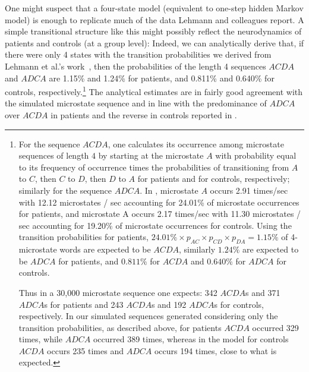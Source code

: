 \documentclass[journal]{IEEEtran}
\begin{document}
 


One might suspect that a four-state model (equivalent to one-step hidden Markov model) is enough to replicate much of the data Lehmann and colleagues report.
A simple transitional structure like this might possibly reflect the neurodynamics of patients and controls (at a group level):
 Indeed, we can analytically 
derive that, if there were only 4 states with the transition probabilities we derived from Lehmann et al.'s work~\cite{Lehmann2005}, then the 
probabilities of the length 4 sequences $ACDA$ and $ADCA$ 
are  1.15\%  and 1.24\%   for patients, and 0.811\%  and 0.640\%  for controls, respectively.\footnote{For the sequence $ACDA$,  one
 calculates its occurrence among microstate sequences of length $4$ by starting at the microstate $A$ with probability equal to its frequency of occurrence times the probabilities of transitioning from  $A$ to $C$, then $C$ to $D$, then $D$ to $A$ for patients and for controls, respectively; similarly for the sequence $ADCA$.
In \cite{Lehmann2005}, microstate $A$ occurs  2.91 times/sec  with 12.12 microstates / sec accounting for 24.01\%  of microstate occurrences  for patients,  
and  microstate A occurs 2.17 times/sec with 11.30 microstates / sec accounting for 19.20\%  of microstate occurrences for controls.
Using the transition probabilities for patients, $24.01\%  \times p_{AC}\times  p_{CD}\times p_{DA}=1.15\% $ of 4-microstate words are expected to be $ACDA$, similarly
$1.24\% $ are expected to be  $ADCA$ for patients,  and $0.811\% $ for $ACDA$  and $0.640\% $ for $ADCA$ for controls. 

Thus in a 30,000 microstate sequence one expects:
342 $ACDA$s and 371 $ADCA$s for patients and 
243 $ACDA$s and 192 $ADCA$s for controls, respectively.
In  our simulated sequences generated considering only the transition probabilities, as described above, 
 for patients $ACDA$ occurred 329 times, while $ADCA$ occurred 389 times, whereas in the model for controls $ACDA$ occurs 235 times and $ADCA$ occurs 194 times,
 close to what is expected.}  
 The analytical estimates are in fairly good agreement with the simulated microstate sequence and in line
with the predominance of $ADCA$ over $ACDA$ in patients and the reverse in controls reported in \cite{Lehmann2005}.
\end{document}
